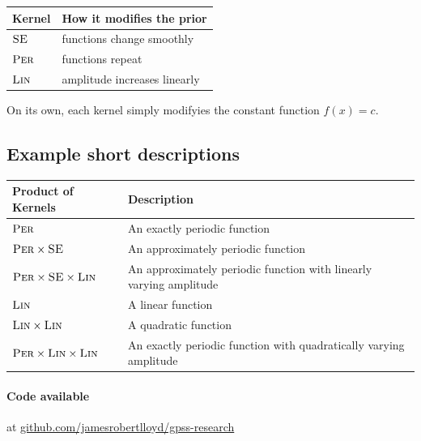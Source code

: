 \documentclass[landscape,a0b,final,a4resizeable]{a0poster}
\newenvironment{poster}{
  \begin{center}
  \begin{minipage}[c]{0.96\textwidth}
}{
  \end{minipage} 
  \end{center}
}
\begin{document}
\begin{poster}
\begin{multicols}{3}
\vspace{1\baselineskip}

\centering
\begin{tabular}{l|l}
Kernel & How it modifies the prior \\
\midrule
$\textsc{SE}$ & functions change smoothly \\
${\textsc{Per}}$ & functions repeat \\
${\textsc{Lin}}$ & amplitude increases linearly
\end{tabular}

\vspace{1\baselineskip}

On its own, each kernel simply modifyies the constant function $f(x) = c$.



\subsection*{Example short descriptions}

\centering
\begin{tabular}{l|l}
Product of Kernels & Description \\
\midrule
${\textsc{Per}}$ & An exactly periodic function \\
${\textsc{Per}} \times {\textsc{SE}}$ & An approximately periodic function \\
${\textsc{Per}} \times {\textsc{SE}} \times {\textsc{Lin}}$ & An approximately periodic function with linearly varying amplitude \\
${\textsc{Lin}}$ & A linear function \\
${\textsc{Lin}} \times {\textsc{Lin}}$ & A quadratic function \\
${\textsc{Per}} \times {\textsc{Lin}} \times {\textsc{Lin}}$ & An exactly periodic function with quadratically varying amplitude\\
\end{tabular}

\vspace{1\baselineskip}

\raggedright
\paragraph{Code available} at \url{github.com/jamesrobertlloyd/gpss-research}

\end{multicols}

\end{poster}
\end{document}
